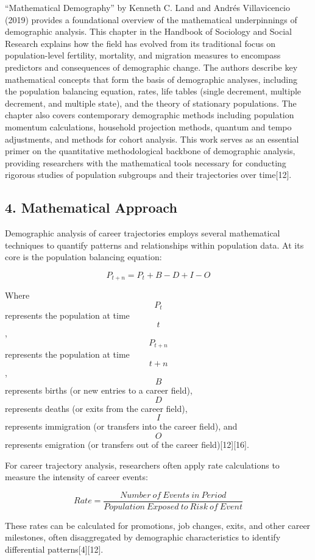 \documentclass[
  letterpaper,
  DIV=11,
  numbers=noendperiod]{scrartcl}
\begin{document}
``Mathematical Demography'' by Kenneth C. Land and Andrés Villavicencio
(2019) provides a foundational overview of the mathematical
underpinnings of demographic analysis. This chapter in the Handbook of
Sociology and Social Research explains how the field has evolved from
its traditional focus on population-level fertility, mortality, and
migration measures to encompass predictors and consequences of
demographic change. The authors describe key mathematical concepts that
form the basis of demographic analyses, including the population
balancing equation, rates, life tables (single decrement, multiple
decrement, and multiple state), and the theory of stationary
populations. The chapter also covers contemporary demographic methods
including population momentum calculations, household projection
methods, quantum and tempo adjustments, and methods for cohort analysis.
This work serves as an essential primer on the quantitative
methodological backbone of demographic analysis, providing researchers
with the mathematical tools necessary for conducting rigorous studies of
population subgroups and their trajectories over time{[}12{]}.

\subsection{4. Mathematical Approach}\label{mathematical-approach}

Demographic analysis of career trajectories employs several mathematical
techniques to quantify patterns and relationships within population
data. At its core is the population balancing equation:

\[ P_{t+n} = P_t + B - D + I - O \]

Where \[P_t\] represents the population at time \[t\], \[P_{t+n}\]
represents the population at time \[t+n\], \[B\] represents births (or
new entries to a career field), \[D\] represents deaths (or exits from
the career field), \[I\] represents immigration (or transfers into the
career field), and \[O\] represents emigration (or transfers out of the
career field){[}12{]}{[}16{]}.

For career trajectory analysis, researchers often apply rate
calculations to measure the intensity of career events:

\[ Rate = \frac{Number\:of\:Events\:in\:Period}{Population\:Exposed\:to\:Risk\:of\:Event} \]

These rates can be calculated for promotions, job changes, exits, and
other career milestones, often disaggregated by demographic
characteristics to identify differential patterns{[}4{]}{[}12{]}.
\end{document}
